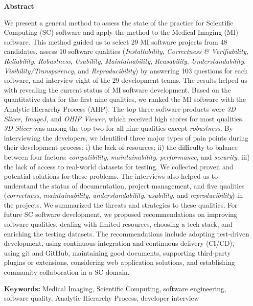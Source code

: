 \begin{center}
\textbf{\large Abstract}
\end{center}

\begingroup
{}
We present a general method to assess the state of the practice for Scientific Computing (SC) software and apply the method to the Medical Imaging (MI) software. This method guided us to select 29 MI software projects from 48 candidates, assess 10 software qualities (\textit{Installability}, \textit{Correctness \& Verifiability}, \textit{Reliability}, \textit{Robustness}, \textit{Usability}, \textit{Maintainability}, \textit{Reusability}, \textit{Understandability}, \textit{Visibility/Transparency}, and \textit{Reproducibility}) by answering 103 questions for each software, and interview eight of the 29 development teams. The results helped us with revealing the current status of MI software development. Based on the quantitative data for the first nine qualities, we ranked the MI software with the Analytic Hierarchy Process (AHP). The top three software products were \textit{3D Slicer}, \textit{ImageJ}, and \textit{OHIF Viewer}, which received high scores for most qualities. \textit{3D Slicer} was among the top two for all nine qualities except \textit{robustness}. By interviewing the developers, we identified three major types of pain points during their development process: i) the lack of resources; ii) the difficulty to balance between four factors: \textit{compatibility}, \textit{maintainability}, \textit{performance}, and \textit{security};
iii) the lack of access to real-world datasets for testing. We collected proven and potential solutions for these problems. The interviews also helped us to understand the status of documentation, project management, and five qualities (\textit{correctness}, \textit{maintainability}, \textit{understandability}, \textit{usability}, and \textit{reproducibility}) in the projects. We summarized the threats and strategies to these qualities. For future SC software development, we proposed recommendations on improving software qualities, dealing with limited resources, choosing a tech stack, and enriching the testing datasets. The recommendations include adopting test-driven development, using continuous integration and continuous delivery (CI/CD), using git and GitHub, maintaining good documents, supporting third-party plugins or extensions, considering web application solutions, and establishing community collaboration in a SC domain.  \newline

\noindent\textbf{Keywords:} Medical Imaging, Scientific Computing, software engineering, software quality, Analytic Hierarchy Process, developer interview
\endgroup
